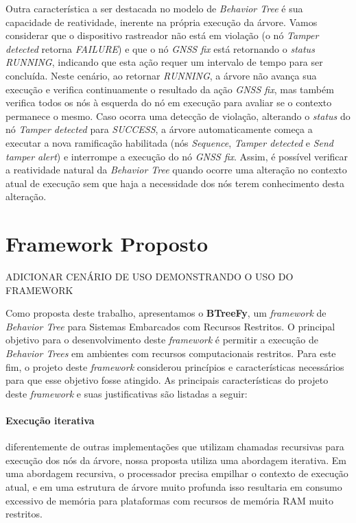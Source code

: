 \documentclass[conference]{IEEEtran}
\begin{document}
Outra característica a ser destacada no modelo de \textit{Behavior Tree} é sua capacidade de reatividade, inerente na própria execução da árvore. Vamos considerar que o dispositivo rastreador não está em violação (o nó \textit{Tamper detected} retorna \textit{FAILURE}) e que o nó \textit{GNSS fix} está retornando o \textit{status} \textit{RUNNING}, indicando que esta ação requer um intervalo de tempo para ser concluída. Neste cenário, ao retornar \textit{RUNNING}, a árvore não avança sua execução e verifica continuamente o resultado da ação \textit{GNSS fix}, mas também verifica todos os nós à esquerda do nó em execução para avaliar se o contexto permanece o mesmo. Caso ocorra uma detecção de violação, alterando o \textit{status} do nó \textit{Tamper detected} para \textit{SUCCESS}, a árvore automaticamente começa a executar a nova ramificação habilitada (nós \textit{Sequence}, \textit{Tamper detected} e \textit{Send tamper alert}) e interrompe a execução do nó \textit{GNSS fix}. Assim, é possível verificar a reatividade natural da \textit{Behavior Tree} quando ocorre uma alteração no contexto atual de execução sem que haja a necessidade dos nós terem conhecimento desta alteração.

\section{Framework Proposto}

ADICIONAR CENÁRIO DE USO DEMONSTRANDO O USO DO FRAMEWORK

Como proposta deste trabalho, apresentamos o \textbf{BTreeFy}, um \textit{framework} de \textit{Behavior Tree} para Sistemas Embarcados com Recursos Restritos. O principal objetivo para o desenvolvimento deste \textit{framework} é permitir a execução de \textit{Behavior Trees} em ambientes com recursos computacionais restritos. Para este fim, o projeto deste \textit{framework} considerou princípios e características necessários para que esse objetivo fosse atingido.
As principais características do projeto deste \textit{framework} e suas justificativas são listadas a seguir:


\paragraph{\textbf{Execução iterativa}} diferentemente de outras implementações que utilizam chamadas recursivas para execução dos nós da árvore, nossa proposta utiliza uma abordagem iterativa. Em uma abordagem recursiva, o processador precisa empilhar o contexto de execução atual, e em uma estrutura de árvore muito profunda isso resultaria em consumo excessivo de memória para plataformas com recursos de memória RAM muito restritos.
\end{document}
